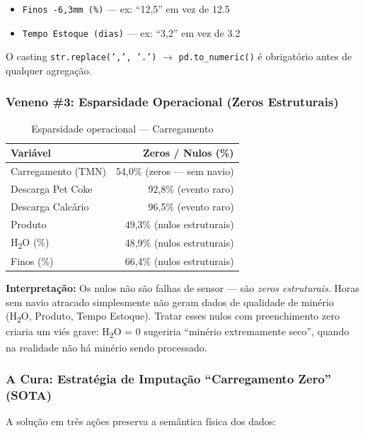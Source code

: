 \documentclass[12pt, a4paper]{article}
\newcommand{\feature}[1]{\texttt{#1}}
\begin{document}
\begin{itemize}
    \item \feature{Finos -6,3mm (\%)} — ex: ``12,5'' em vez de 12.5
    \item \feature{Tempo Estoque (dias)} — ex: ``3,2'' em vez de 3.2
\end{itemize}

O casting \texttt{str.replace(',', '.')} $\to$ \texttt{pd.to\_numeric()} é
obrigatório antes de qualquer agregação.

\subsubsection{Veneno \#3: Esparsidade Operacional (Zeros Estruturais)}

\begin{table}[H]
\centering
\caption{Esparsidade operacional — Carregamento}
\label{tab:carreg_sparse}
\begin{tabular}{@{}lr@{}}
\toprule
\textbf{Variável}         & \textbf{Zeros / Nulos (\%)} \\
\midrule
Carregamento (TMN)         & 54,0\% (zeros — sem navio) \\
Descarga Pet Coke          & 92,8\% (evento raro) \\
Descarga Calcário          & 96,5\% (evento raro) \\
Produto                    & 49,3\% (nulos estruturais) \\
H\textsubscript{2}O (\%)  & 48,9\% (nulos estruturais) \\
Finos (\%)                 & 66,4\% (nulos estruturais) \\
\bottomrule
\end{tabular}
\end{table}

\textbf{Interpretação:} Os nulos não são falhas de sensor — são
\textit{zeros estruturais}. Horas sem navio atracado simplesmente não
geram dados de qualidade de minério (H\textsubscript{2}O, Produto,
Tempo Estoque). Tratar esses nulos com preenchimento zero criaria um
viés grave: H\textsubscript{2}O = 0 sugeriria ``minério extremamente
seco'', quando na realidade não há minério sendo processado.

\subsubsection{A Cura: Estratégia de Imputação ``Carregamento Zero'' (SOTA)}

A solução em três ações preserva a semântica física dos dados:
\end{document}
